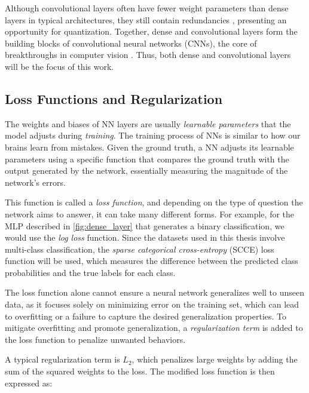 Although convolutional layers often have fewer weight parameters than dense layers in typical architectures, 
they still contain redundancies \cite{huang2017densely}, presenting an opportunity for quantization. 
Together, dense and convolutional layers form the building blocks of convolutional neural networks (CNNs), 
the core of breakthroughs in computer vision \cite{DBLP:journals/nature/LeCunBH15} \cite{DBLP:conf/nips/KrizhevskySH12} \cite{DBLP:conf/cvpr/SzegedyLJSRAEVR15}.
Thus, both dense and convolutional layers will be the focus of this work.


\subsection{Loss Functions and Regularization}
\label{subsec:lossregularization}
\hspace*{1em}The weights and biases of NN layers are usually \textit{learnable parameters}
that the model adjusts during \textit{training}.
The training process of NNs is similar to how our brains learn from mistakes. 
Given the ground truth, a NN adjusts its learnable parameters 
using a specific function that compares the ground truth with the output generated by the network, 
essentially measuring the magnitude of the network's errors.

This function is called a \textit{loss function}, and depending on the type of question the network aims to answer, it can take many different forms.
For example, for the MLP described in \cref{fig:dense_layer} that generates a binary classification, we would use the \textit{log loss} function. 
Since the datasets used in this thesis involve multi-class classification, the \textit{sparse categorical cross-entropy} (SCCE) loss function will be used, 
which measures the difference between the predicted class probabilities and the true labels for each class.

The loss function alone cannot ensure a neural network generalizes well to unseen data, 
as it focuses solely on minimizing error on the training set,
which can lead to overfitting or a failure to capture the desired generalization properties.
To mitigate overfitting and promote generalization,
a \textit{regularization term} is added to the loss function
to penalize unwanted behaviors.

A typical regularization term is \( L_2 \), 
which penalizes large weights by adding the sum of the squared weights to the loss. 
The modified loss function is then expressed as:

